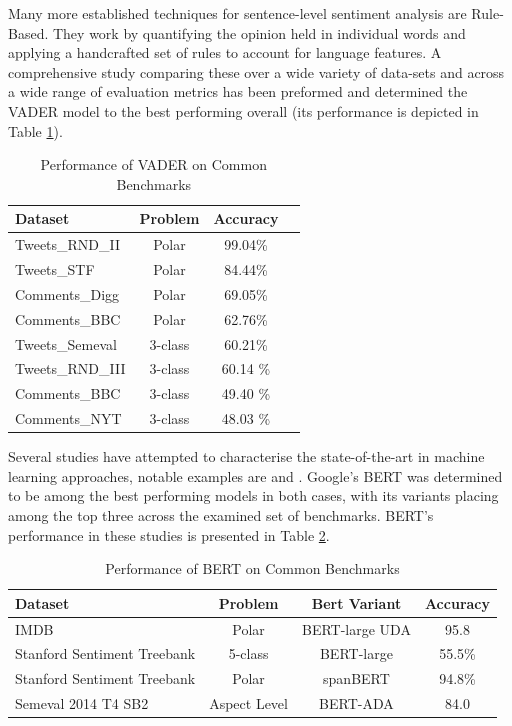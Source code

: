 \documentclass{csfourzero}
\begin{document}
\par
Many more established techniques for sentence-level sentiment analysis are Rule-Based. They work by quantifying the opinion held in individual words and applying a handcrafted set of rules to account for language features. A comprehensive study comparing these over a wide variety of data-sets and across a wide range of evaluation metrics has been preformed \cite{sentibench} and determined the VADER model to the best performing overall (its performance is depicted in Table \ref{tab:vaderPerf}).
\par

\begin{table}[h]
    \centering
    \begin{tabular}[t]{lccc}
        \hline
        Dataset & Problem & Accuracy \\
        \hline
        Tweets_RND_II & Polar & 99.04\% \\
        Tweets_STF & Polar & 84.44\% \\
        Comments_Digg & Polar & 69.05\% \\
        Comments_BBC & Polar & 62.76\% \\
        Tweets_Semeval & 3-class &  60.21\% \\
        Tweets_RND_III & 3-class & 60.14 \% \\
        Comments_BBC & 3-class &  49.40 \% \\
        Comments_NYT & 3-class & 48.03 \% \\
        \hline
    \end{tabular}
    \caption{Performance of VADER on Common Benchmarks \cite{sentibench}}
    \label{tab:vaderPerf}
\end{table}
    
\par
Several studies have attempted to characterise the state-of-the-art in machine learning approaches, notable examples are \cite{beneaththeiceberg} and \cite{stateOfTheArt}. Google's BERT was determined to be among the best performing models in both cases, with its variants placing among the top three across the examined set of benchmarks. BERT's performance in these studies is presented in Table \ref{tab:bertPerf}. 

\begin{table}[h]
    \centering
    \begin{tabular}[t]{lccc}
        \hline
        Dataset & Problem & Bert Variant & Accuracy \\
        \hline
        IMDB & Polar & BERT-large UDA & 95.8 \\
        Stanford Sentiment Treebank & 5-class & BERT-large & 55.5\% \\
        Stanford Sentiment Treebank & Polar & spanBERT & 94.8\% \\
        Semeval 2014 T4 SB2 & Aspect Level  & BERT-ADA & 84.0 \\
        \hline
    \end{tabular}
    \caption{Performance of BERT on Common Benchmarks \cite{beneaththeiceberg}}
    \label{tab:bertPerf}
\end{table}
\end{document}
